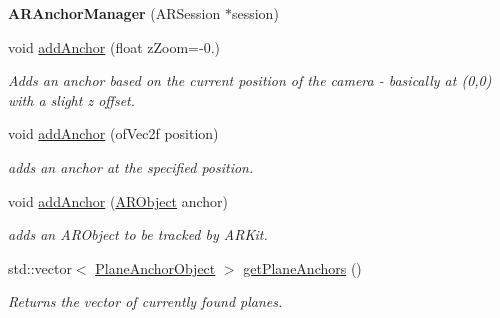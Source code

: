 \begin{DoxyCompactItemize}
\item 
\mbox{\label{class_a_r_core_1_1_a_r_anchor_manager_a471dcdacaedea4647a04c34052742a61}} 
{\bfseries A\+R\+Anchor\+Manager} (A\+R\+Session $\ast$session)
\item 
\mbox{\label{class_a_r_core_1_1_a_r_anchor_manager_a462546bf84296188fd899d533a3c17bd}} 
void \hyperlink{class_a_r_core_1_1_a_r_anchor_manager_a462546bf84296188fd899d533a3c17bd}{add\+Anchor} (float z\+Zoom=-\/0.)
\begin{DoxyCompactList}\small\item\em Adds an anchor based on the current position of the camera -\/ basically at (0,0) with a slight z offset. \end{DoxyCompactList}\item 
\mbox{\label{class_a_r_core_1_1_a_r_anchor_manager_afe2f4b207f8d7c2e1ed11dd50eae5ed4}} 
void \hyperlink{class_a_r_core_1_1_a_r_anchor_manager_afe2f4b207f8d7c2e1ed11dd50eae5ed4}{add\+Anchor} (of\+Vec2f position)
\begin{DoxyCompactList}\small\item\em adds an anchor at the specified position. \end{DoxyCompactList}\item 
\mbox{\label{class_a_r_core_1_1_a_r_anchor_manager_ae710a985f06cfe488f218f49e8d0329a}} 
void \hyperlink{class_a_r_core_1_1_a_r_anchor_manager_ae710a985f06cfe488f218f49e8d0329a}{add\+Anchor} (\hyperlink{struct_a_r_objects_1_1_a_r_object}{A\+R\+Object} anchor)
\begin{DoxyCompactList}\small\item\em adds an A\+R\+Object to be tracked by A\+R\+Kit. \end{DoxyCompactList}\item 
\mbox{\label{class_a_r_core_1_1_a_r_anchor_manager_a46a02253729234aef5617512f48e9211}} 
std\+::vector$<$ \hyperlink{struct_a_r_objects_1_1_plane_anchor_object}{Plane\+Anchor\+Object} $>$ \hyperlink{class_a_r_core_1_1_a_r_anchor_manager_a46a02253729234aef5617512f48e9211}{get\+Plane\+Anchors} ()
\begin{DoxyCompactList}\small\item\em Returns the vector of currently found planes. \end{DoxyCompactList}\item 

\end{DoxyCompactItemize}
